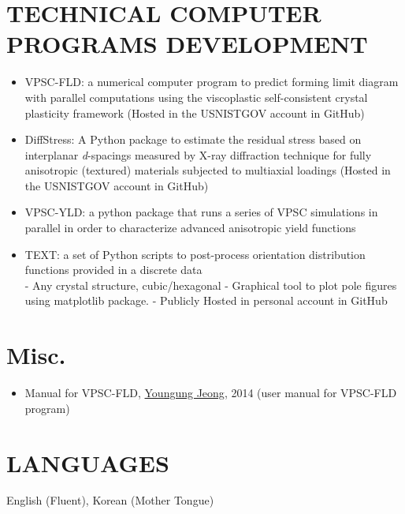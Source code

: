 \documentclass{res}
\begin{document}
\begin{resume}
  \section{TECHNICAL COMPUTER PROGRAMS DEVELOPMENT}
  \begin{itemize}
  \item VPSC-FLD: a numerical computer program to predict forming limit diagram with parallel computations using the viscoplastic self-consistent crystal plasticity framework (Hosted in the USNISTGOV account in GitHub) \\
  \item DiffStress: A Python package to estimate the residual stress based on interplanar \emph{d}-spacings measured by X-ray diffraction technique for fully anisotropic (textured) materials subjected to multiaxial loadings (Hosted in the USNISTGOV account in GitHub) \\
  \item VPSC-YLD: a python package that runs a series of VPSC simulations in parallel in order to characterize advanced anisotropic yield functions \\
  \item TEXT: a set of Python scripts to post-process orientation distribution functions provided in a discrete data \\
    - Any crystal structure, cubic/hexagonal
    - Graphical tool to plot pole figures using matplotlib package.
    - Publicly Hosted in personal account in GitHub
  \end{itemize}

  \section{Misc.}
  \begin{itemize}
  \item Manual for VPSC-FLD, \underline{Youngung Jeong}, 2014 (user manual for VPSC-FLD program)
  \end{itemize}

  \section{LANGUAGES}
  English (Fluent), Korean (Mother Tongue)


\end{resume}
\end{document}
